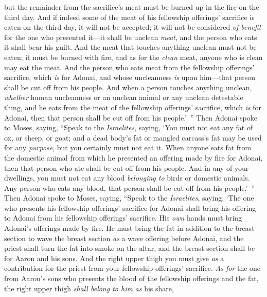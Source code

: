 \begin{biblechapter}
\verse but the remainder from the sacrifice’s meat must be burned up in the fire on the third day.
\verse And if indeed some of the meat of his fellowship offerings’ sacrifice is eaten on the third day, it will not be accepted; it will not be considered \textit{of benefit} for the one who presented it—it shall be unclean \textit{meat}, and the person who eats it shall bear his guilt.
\verse And the meat that touches anything unclean must not be eaten; it must be burned with fire, and as for the \textit{clean} meat, anyone who is clean may eat the meat.
\verse And the person who eats meat from the fellowship offerings’ sacrifice, which \textit{is} for Adonai, and whose uncleanness \textit{is} upon him—that person shall be cut off from his people.
\verse And when a person touches anything unclean, \textit{whether} human uncleanness or an unclean animal or any unclean detestable thing, and he eats from the meat of the fellowship offerings’ sacrifice, which \textit{is} for Adonai, then that person shall be cut off from his people.’ ”
 Then Adonai spoke to Moses, saying,
\verse “Speak to the \textit{Israelites}, saying, ‘You must not eat any fat of ox, or sheep, or goat;
\verse and a dead body’s fat or mangled carcass’s fat may be used for any \textit{purpose}, but you certainly must not eat it.
\verse When anyone eats fat from the domestic animal from which he presented an offering made by fire for Adonai, then that person who ate shall be cut off from his people.
\verse And in any of your dwellings, you must not eat any blood \textit{belonging to} birds or domestic animals.
\verse Any person who eats any blood, that person shall be cut off from his people.’ ”
 Then Adonai spoke to Moses, saying,
\verse “Speak to the \textit{Israelites}, saying, ‘The one who presents his fellowship offerings’ sacrifice for Adonai shall bring his offering to Adonai from his fellowship offerings’ sacrifice.
\verse His \textit{own} hands must bring Adonai’s offerings made by fire. He must bring the fat in addition to the breast section to wave the breast section \textit{as} a wave offering before Adonai,
\verse and the priest shall turn the fat into smoke on the altar, and the breast section shall be for Aaron and his sons.
\verse And the right upper thigh you must give \textit{as} a contribution for the priest from your fellowship offerings’ sacrifice.
\verse \textit{As for} the one from Aaron’s sons who presents the blood of the fellowship offerings and the fat, the right upper thigh \textit{shall belong to him} \textit{as} his share,

\end{biblechapter}
